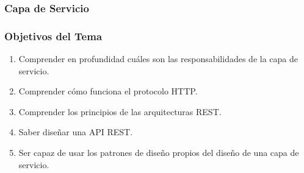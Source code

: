 \documentclass[handout,a4paper,slidestop,xcolor=pst,blue]{beamer}
\begin{document}
\begin{frame}[t]
    \frametitle{Capa de Servicio}
\end{frame}

\begin{frame}[c]
    \frametitle{Objetivos del Tema}
    \begin{enumerate}[<+->]
         \item Comprender en profundidad cuáles son las responsabilidades de la capa de servicio.
         \item Comprender cómo funciona el protocolo HTTP.
         \item Comprender los principios de las arquitecturas REST.
         \item Saber diseñar una API REST.
         \item Ser capaz de usar los patrones de diseño propios del diseño de una capa de servicio.
    \end{enumerate}
\end{frame}
\end{document}
